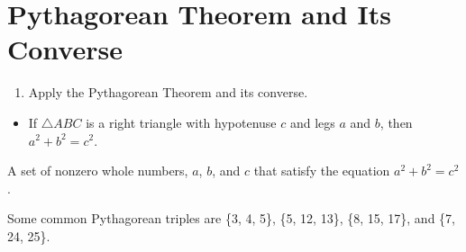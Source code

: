 \documentclass{article}
\begin{document}
\section*{Pythagorean Theorem and Its Converse}

\begin{tcolorbox}[colframe=orange!70!white, coltitle=black, title=\textbf{Today I Can}]
\begin{enumerate}
    \item Apply the Pythagorean Theorem and its converse.
\end{enumerate}
\end{tcolorbox}
\smallskip 

\begin{tcolorbox}[colframe=black!20!white, opacitybacktitle=0.1, coltitle=black, title=\textbf{Pythagorean Theorem}]

\begin{minipage}{0.5\textwidth}
\begin{itemize}
    \item If $\triangle ABC$ is a right triangle with hypotenuse $c$ and legs $a$ and $b$, then $a^2+b^2=c^2$.
\end{itemize}
\end{minipage}
\hspace{0.5in}
\begin{minipage}{0.4\textwidth}
\end{minipage}
\end{tcolorbox}
\smallskip 

\begin{tcolorbox}[colframe=black!20!white, opacitybacktitle=0.1, coltitle=black, title=\textbf{Pythagorean Triple}]
A set of nonzero whole numbers, $a$, $b$, and $c$ that satisfy the equation $a^2+b^2=c^2$.
\end{tcolorbox}
\smallskip 

Some common Pythagorean triples are \{3, 4, 5\}, \{5, 12, 13\}, \{8, 15, 17\}, and \{7, 24, 25\}. \newline 
\end{document}
